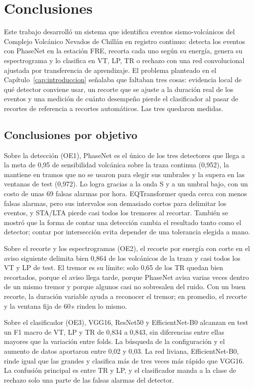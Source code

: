 \chapter{Conclusiones}
\label{cap:conclusiones}

Este trabajo desarrolló un sistema que identifica eventos sismo-volcánicos del
Complejo Volcánico Nevados de Chillán en registro continuo: detecta los
eventos con PhaseNet en la estación FRE, recorta cada uno según su energía,
genera su espectrograma y lo clasifica en VT, LP, TR o rechazo con una red
convolucional ajustada por transferencia de aprendizaje. El problema planteado
en el Capítulo~\ref{cap:introduccion} señalaba que faltaban tres cosas: evidencia
local de qué detector conviene usar, un recorte que se ajuste a la duración
real de los eventos y una medición de cuánto desempeño pierde el clasificador
al pasar de recortes de referencia a recortes automáticos. Las tres quedaron
medidas.

\section{Conclusiones por objetivo}

Sobre la detección (OE1), PhaseNet es el único de los tres detectores que
llega a la meta de 0,95 de sensibilidad volcánica sobre la traza continua
(0,952), la mantiene en tramos que no se usaron para elegir sus umbrales y la
supera en las ventanas de test (0,972). Lo logra gracias a la onda S y a un
umbral bajo, con un costo de unas 69 falsas alarmas por hora. EQTransformer
queda cerca con menos falsas alarmas, pero sus intervalos son demasiado cortos
para delimitar los eventos, y STA/LTA pierde casi todos los tremores al
recortar. También se mostró que la forma de contar una detección cambia el
resultado tanto como el detector; contar por intersección evita depender de
una tolerancia elegida a mano.

Sobre el recorte y los espectrogramas (OE2), el recorte por energía con corte
en el aviso siguiente delimita bien 0,864 de los volcánicos de la traza y casi
todos los VT y LP de test. El tremor es su límite: solo 0,65 de los TR quedan
bien recortados, porque el aviso llega tarde, porque PhaseNet avisa varias
veces dentro de un mismo tremor y porque algunos casi no sobresalen del ruido.
Con un buen recorte, la duración variable ayuda a reconocer el tremor; en
promedio, el recorte y la ventana fija de 60\,s rinden lo mismo.

Sobre el clasificador (OE3), VGG16, ResNet50 y EfficientNet-B0 alcanzan en
test un F1 macro de VT, LP y TR de 0,834 a 0,843, sin diferencias entre ellas
mayores que la variación entre folds. La búsqueda de la configuración y el
aumento de datos aportaron entre 0,02 y 0,03. La red liviana, EfficientNet-B0,
rinde igual que las grandes y clasifica más de tres veces más rápido que
VGG16. La confusión principal es entre TR y LP, y el clasificador manda a la
clase de rechazo solo una parte de las falsas alarmas del detector.

